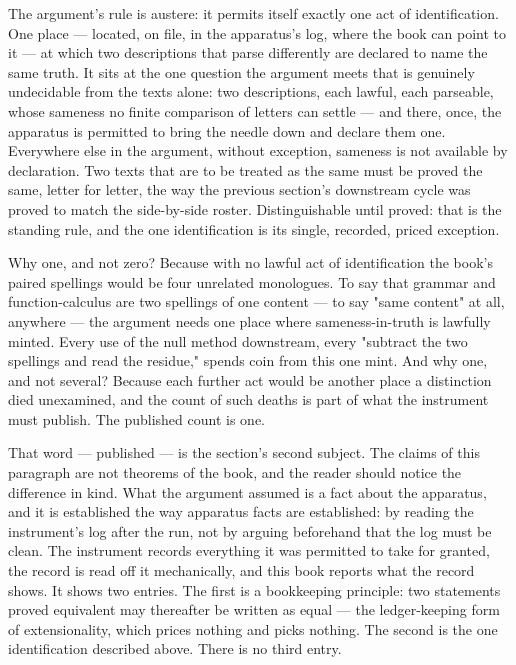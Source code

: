 The argument's rule is austere: it permits itself exactly one act of identification.
One place --- located, on file, in the apparatus's log, where the book can point to it
--- at which two descriptions that parse differently are declared to name the same
truth. It sits at the one question the argument meets that is genuinely undecidable
from the texts alone: two descriptions, each lawful, each parseable, whose sameness no
finite comparison of letters can settle --- and there, once, the apparatus is permitted
to bring the needle down and declare them one. Everywhere else in the argument, without
exception, sameness is not available by declaration. Two texts that are to be treated
as the same must be proved the same, letter for letter, the way the previous section's
downstream cycle was proved to match the side-by-side roster. Distinguishable until
proved: that is the standing rule, and the one identification is its single, recorded,
priced exception.

Why one, and not zero? Because with no lawful act of identification the book's paired
spellings would be four unrelated monologues. To say that grammar and function-calculus
are two spellings of one content --- to say "same content" at all, anywhere --- the
argument needs one place where sameness-in-truth is lawfully minted. Every use of the
null method downstream, every "subtract the two spellings and read the residue," spends
coin from this one mint. And why one, and not several? Because each further act would
be another place a distinction died unexamined, and the count of such deaths is part of
what the instrument must publish. The published count is one.

That word --- published --- is the section's second subject. The claims of this
paragraph are not theorems of the book, and the reader should notice the difference in
kind. What the argument assumed is a fact about the apparatus, and it is established
the way apparatus facts are established: by reading the instrument's log after the run,
not by arguing beforehand that the log must be clean. The instrument records everything
it was permitted to take for granted, the record is read off it mechanically, and this
book reports what the record shows. It shows two entries. The first is a bookkeeping
principle: two statements proved equivalent may thereafter be written as equal --- the
ledger-keeping form of extensionality, which prices nothing and picks nothing. The
second is the one identification described above. There is no third entry.

